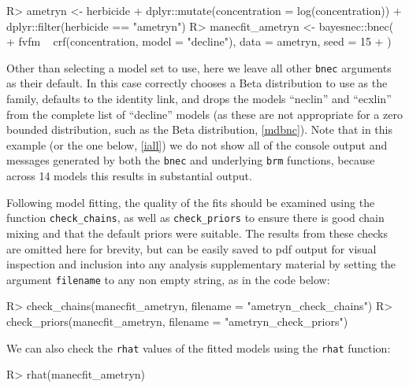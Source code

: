 \documentclass[
  shortnames]{jss}
\begin{document}
\begin{CodeChunk}
\begin{CodeInput}
R> ametryn <- herbicide %
+   dplyr::mutate(concentration = log(concentration)) %
+   dplyr::filter(herbicide == "ametryn")
R> manecfit_ametryn <- bayesnec::bnec(
+   fvfm ~ crf(concentration, model = "decline"), data = ametryn, seed = 15
+ )
\end{CodeInput}
\end{CodeChunk}

Other than selecting a model set to use, here we leave all other \texttt{bnec} arguments as their default. In this case  correctly chooses a Beta distribution to use as the family, defaults to the identity link, and drops the models ``neclin'' and ``ecxlin'' from the complete list of ``decline'' models (as these are not appropriate for a zero bounded distribution, such as the Beta distribution, \ref{mdbnc}). Note that in this example (or the one below, \ref{iall}) we do not show all of the console output and messages generated by both the \texttt{bnec} and underlying \texttt{brm} functions, because across 14 models this results in substantial output.

Following model fitting, the quality of the fits should be examined using the function \texttt{check\_chains}, as well as \texttt{check\_priors} to ensure there is good chain mixing and that the default priors were suitable. The results from these checks are omitted here for brevity, but can be easily saved to pdf output for visual inspection and inclusion into any analysis supplementary material by setting the argument \texttt{filename} to any non empty string, as in the code below:

\begin{CodeChunk}
\begin{CodeInput}
R> check_chains(manecfit_ametryn, filename = "ametryn_check_chains")
R> check_priors(manecfit_ametryn, filename = "ametryn_check_priors")
\end{CodeInput}
\end{CodeChunk}

We can also check the \texttt{rhat} values of the fitted models using the \texttt{rhat} function:

\begin{CodeChunk}
\begin{CodeInput}
R> rhat(manecfit_ametryn)
\end{CodeInput}
\end{CodeChunk}
\end{document}
